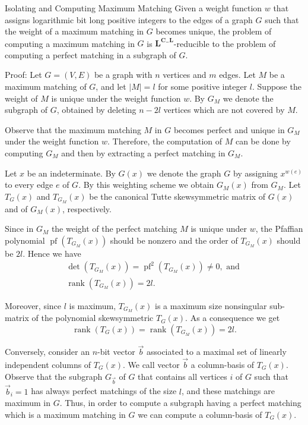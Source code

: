 \documentclass{beamer}
\begin{document}
\begin{frame}[allowframebreaks]{Isolating and Computing Maximum Matching}
	Given a weight function $w$ that assigns
	logarithmic bit long positive integers to the edges of a
	graph $G$ such that the weight of a maximum matching
	in $G$ becomes unique, the problem of computing a maximum matching in $G$ is $\mathbf{L}^{\mathbf{C}_{=}\mathbf{L}} $-reducible to the problem of computing a perfect matching in a subgraph of $G$.
	
	Proof: Let $G=(V, E)$ be a graph with $n$ vertices and $m$ edges. Let $M$ be a maximum matching of $G$, and let $|M|=l$ for some positive integer $l$. Suppose the weight of $M$ is unique under the weight function $w$. By $G_M$ we denote the subgraph of $G$, obtained by deleting $n-2 l$ vertices which are not covered by $M$.
	
	Observe that the maximum matching $M$ in $G$ becomes perfect and unique in $G_M$ under the weight function $w$. Therefore, the computation of $M$ can be done by computing $G_M$ and then by extracting a perfect matching in $G_M$.
	
	Let $x$ be an indeterminate. By $G(x)$ we denote the graph $G$ by assigning $x^{w(e)}$ to every edge $e$ of $G$. By this weighting scheme we obtain $G_M(x)$ from $G_M$. Let $T_G(x)$ and $T_{G_M}(x)$ be the canonical Tutte skewsymmetric matrix of $G(x)$ and of $G_M(x)$, respectively.
	
	Since in $G_M$ the weight of the perfect matching $M$ is unique under $w$, the Pfaffian polynomial $\operatorname{pf}\left(T_{G_M}(x)\right)$ should be nonzero and the order of $T_{G_M}(x)$ should be $2 l$. Hence we have
	$$
	\begin{gathered}
		\operatorname{det}\left(T_{G_M}(x)\right)=\operatorname{pf}^2\left(T_{G_M}(x)\right) \neq 0, \text { and } \\
		\operatorname{rank}\left(T_{G_M}(x)\right)=2 l .
	\end{gathered}
	$$
	
	Moreover, since $l$ is maximum, $T_{G_M}(x)$ is a maximum size nonsingular sub-matrix of the polynomial skewsymmetric $T_G(x)$. As a consequence we get
	$$
	\operatorname{rank}\left(T_G(x)\right)=\operatorname{rank}\left(T_{G_M}(x)\right)=2 l .
	$$
	
	Conversely, consider an $n$-bit vector $\vec{b}$ associated to a maximal set of linearly independent columns of $T_G(x)$. We call vector $\vec{b}$ a column-basis of $T_G(x)$. Observe that the subgraph $G_{\vec{b}}$ of $G$ that contains all vertices $i$ of $G$ such that $\vec{b}_i=1$ has always perfect matchings of the size $l$, and these matchings are maximum in $G$. Thus, in order to compute a subgraph having a perfect matching which is a maximum matching in $G$ we can compute a column-basis of $T_G(x)$.
	

\end{frame}
\end{document}
